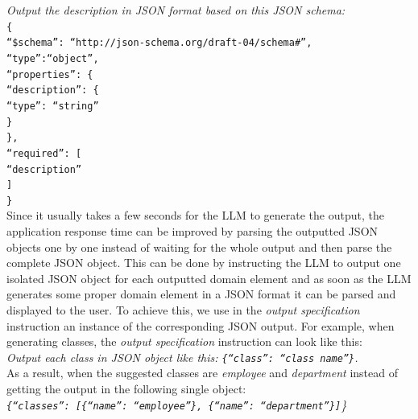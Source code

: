 \noindent{}\textit{Output the description in JSON format based on this JSON schema:} \\
\texttt{\frenchspacing\{ \\
\null \quad ``\$schema'': ``http://json-schema.org/draft-04/schema\#'', \\
\null \quad  ``type'':``object'', \\
\null \quad  ``properties'': \{ \\
\null \quad \quad ``description'': \{ \\
\null \quad \quad \quad ``type'': ``string'' \\
\null \quad \quad   \} \\
\null \quad  \}, \\
\null \quad  ``required'': [ \\
\null \quad \quad   ``description'' \\
\null \quad  ] \\
\}} \\


Since it usually takes a few seconds for the LLM to generate the output, the application response time can be improved by parsing the outputted JSON objects one by one instead of waiting for the whole output and then parse the complete JSON object. This can be done by instructing the LLM to output one isolated JSON object for each outputted domain element and as soon as the LLM generates some proper domain element in a JSON format it can be parsed and displayed to the user. To achieve this, we use in the \emph{output specification} instruction an instance of the corresponding JSON output. For example, when generating classes, the \emph{output specification} instruction can look like this: \\

\noindent{}\textit{Output each class in JSON object like this: \texttt{\frenchspacing\{``class'': ``class name''\}}.} \\

\noindent{}As a result, when the suggested classes are \textit{employee} and \textit{department} instead of getting the output in the following single object: \\

\noindent{}\textit{\texttt{\frenchspacing\{``classes'': [\{``name'': ``employee''\}, \{``name'': ``department''\}]}\}} \\

 \\

